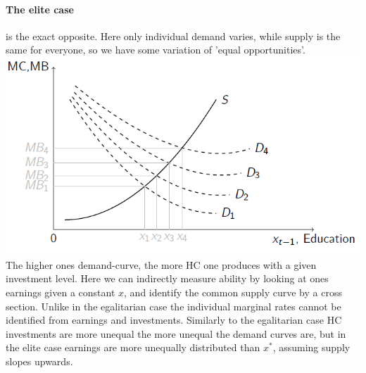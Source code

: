 \documentclass[12pt, a4paper]{article}
\begin{document}
\begin{multicols}{2}
\paragraph{The elite case} is the exact opposite. Here only individual demand varies, while supply is the same for everyone, so we have some variation of 'equal opportunities'.
\includegraphics[width = 0.45 \textwidth]{elite.PNG}
The higher ones demand-curve, the more HC one produces with a given investment level. Here we can indirectly measure ability by looking at ones earnings given a constant $x$, and identify the common supply curve by a cross section. Unlike in the egalitarian case the individual marginal rates cannot be identified from earnings and investments. Similarly to the egalitarian case HC investments are more unequal the more unequal the demand curves are, but in the elite case earnings are more unequally distributed than $x^*$, assuming supply slopes upwards.


\end{multicols}
\end{document}
